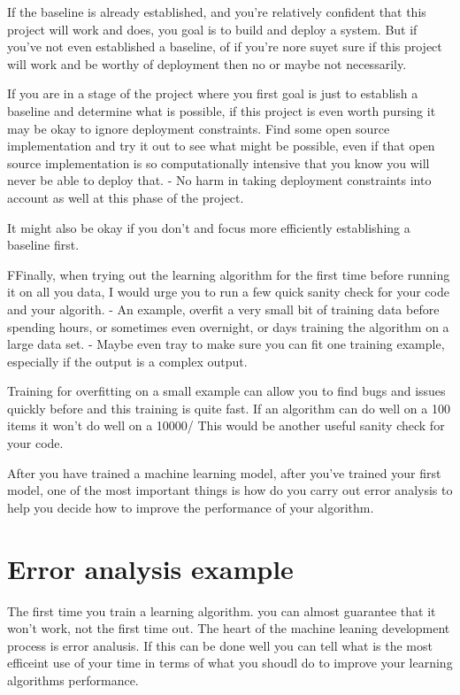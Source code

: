 If the baseline is already established, and you're relatively confident that this project will work and does, you goal is to build and deploy a system.
But if you've not even established a baseline, of if you're nore suyet sure if this project will work and be worthy of deployment then no or maybe not necessarily.

If you are in a stage of the project where you first goal is just to establish a baseline and determine what is possible, if this project is even worth pursing it may be okay to ignore deployment constraints.
Find some open source implementation and try it out to see what might be possible, even if that open source implementation is so computationally intensive that you know you will never be able to deploy that.
- No harm in taking deployment constraints into account as well at this phase of the project.


It might also be okay if you don't and focus more efficiently establishing a baseline first.

FFinally, when trying out the learning algorithm for the first time before running it on all you data, I would urge you to run a few quick sanity check for your code and your algorith.
- An example, overfit a very small bit of training data before spending hours, or sometimes even overnight, or days training the algorithm on a large data set.
- Maybe even tray to make sure you can fit one training example, especially if the output is a complex output.

Training for overfitting on a small example can allow you to find bugs and issues quickly before and this training is quite fast.
If an algorithm can do well on a 100 items it won't do well on a 10000/
This would be another useful sanity check for your code.

After you have trained a machine learning model, after you've trained your first model, one of the most important things is how do you carry out error analysis to help you decide how to improve the performance of your algorithm.

\section{Error analysis example}


The first time you train a learning algorithm. you can almost guarantee that it won't work, not the first time out.
The heart of the machine leaning development process is error analusis. If this can be done well you can tell what is the most efficeint use of your time in terms of what you shoudl do to improve your learning algorithms performance.

